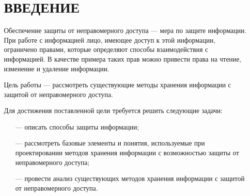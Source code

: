 


\normalsize
\setcounter{page}{3}

\pagebreak

\tableofcontents
\normalsize

\pagebreak


\section*{ВВЕДЕНИЕ}

Обеспечение защиты от неправомерного доступа --- мера по защите информации. При работе с информацией лицо, имеющее доступ к этой информации, ограничено правами, которые определяют способы взаимодействия с информацией. В качестве примера таких прав можно привести права на чтение, изменение и удаление информации.

Цель работы --- рассмотреть существующие методы хранения информации с защитой от неправомерного доступа.

Для достижения поставленной цели требуется решить следующие задачи:
\begin{itemize}
	\item [---] описать способы защиты информации;
	\item [---] рассмотреть базовые элементы и понятия, используемые при проектировании методов хранения информации с возможностью защиты от неправомерного доступа;
	\item [---] провести анализ существующих методов хранения информации с защитой от неправомерного доступа.
\end{itemize}
\pagebreak

